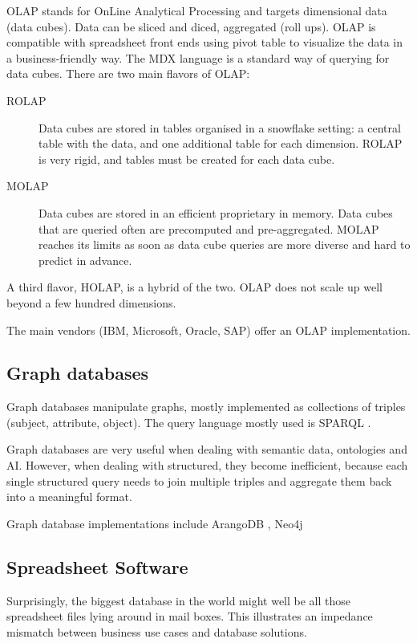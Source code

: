 \documentclass{vldb}
\begin{document}
OLAP \cite{Codd1993} stands for OnLine Analytical Processing and targets dimensional data (data cubes). Data can be sliced and diced, aggregated (roll ups). OLAP is compatible with spreadsheet front ends using pivot table to visualize the data in a business-friendly way. The MDX language \cite{Nolan1999} is a standard way of querying for data cubes. There are two main flavors of OLAP:
\begin{description}
\item[ROLAP] Data cubes are stored in tables organised in a snowflake setting: a central table with the data, and one additional table for each dimension. ROLAP is very rigid, and tables must be created for each data cube.
\item[MOLAP] Data cubes are stored in an efficient proprietary in memory. Data cubes that are queried often are precomputed and pre-aggregated. MOLAP reaches its limits as soon as data cube queries are more diverse and hard to predict in advance.
\end{description}

A third flavor, HOLAP, is a hybrid of the two. OLAP does not scale up well beyond a few hundred dimensions.

The main vendors (IBM, Microsoft, Oracle, SAP) offer an OLAP implementation.

\subsection{Graph databases}

Graph databases manipulate graphs, mostly implemented as collections of triples (subject, attribute, object). The query language mostly used is SPARQL \cite{SPARQL}.

Graph databases are very useful when dealing with semantic data, ontologies and AI. However, when dealing with structured, they become inefficient, because each single structured query needs to join multiple triples and aggregate them back into a meaningful format.

Graph database implementations include ArangoDB \cite{ArangoDB}, Neo4j \cite{Neo4j}

\subsection{Spreadsheet Software}

Surprisingly, the biggest database in the world might well be all those spreadsheet files lying around in mail boxes. This illustrates an impedance mismatch between business use cases and database solutions.
\end{document}

